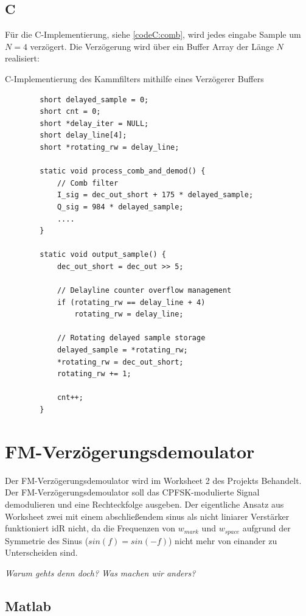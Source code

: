 \documentclass{article}
\begin{document}
\subsection{C}
Für die C-Implementierung, siehe \ref{codeC:comb}, wird jedes eingabe Sample um $N = 4$ verzögert.
Die Verzögerung wird über ein Buffer Array der Länge $N$ realisiert:
\begin{listing}\label{codeC:comb}
    \caption{C-Implementierung des Kammfilters mithilfe eines Verzögerer Buffers}
    \begin{verbatim}
        short delayed_sample = 0;
        short cnt = 0;
        short *delay_iter = NULL;
        short delay_line[4];
        short *rotating_rw = delay_line;
 
        static void process_comb_and_demod() {
            // Comb filter
            I_sig = dec_out_short + 175 * delayed_sample;
            Q_sig = 984 * delayed_sample;
            ....
        }

        static void output_sample() {
            dec_out_short = dec_out >> 5;

            // Delayline counter overflow management
            if (rotating_rw == delay_line + 4)
                rotating_rw = delay_line;
            
            // Rotating delayed sample storage
            delayed_sample = *rotating_rw;
            *rotating_rw = dec_out_short;
            rotating_rw += 1;

            cnt++;
        }
    \end{verbatim}
\end{listing}

\section{FM-Verzögerungsdemoulator} \label{sec:fm-demod}
Der FM-Verzögerungsdemoulator wird im Worksheet 2 des Projekts Behandelt. 
Der FM-Verzögerungsdemoulator soll das CPFSK-modulierte Signal demodulieren und eine Rechteckfolge ausgeben.
Der eigentliche Ansatz aus Worksheet zwei mit einem abschließendem sinus als nicht liniarer Verstärker funktioniert idR nicht, 
da die Frequenzen von $w_{mark}$ und $w_{space}$ aufgrund der Symmetrie des Sinus ($sin(f) = sin(-f)$) nicht mehr von einander zu Unterscheiden sind.

\textit{Warum gehts denn doch? Was machen wir anders?}
\subsection{Matlab}
\end{document}
